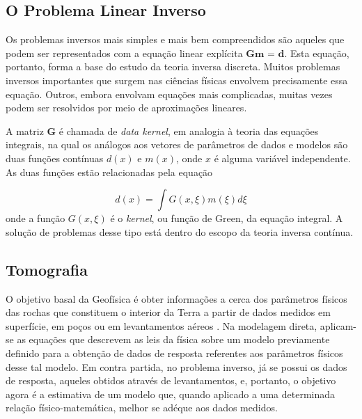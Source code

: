\documentclass[a4paper, 12 pt]{article} %
\begin{document}
\newpage

\subsection{O Problema Linear Inverso}

Os problemas inversos mais simples e mais bem compreendidos são aqueles que podem ser representados com a equação linear explícita $\textbf{Gm = d}$. Esta equação, portanto, forma a base do estudo da teoria inversa discreta. Muitos problemas inversos importantes que surgem nas ciências físicas envolvem precisamente essa equação. Outros, embora envolvam equações mais complicadas, muitas vezes podem ser resolvidos por meio de aproximações lineares.

A matriz $\textbf{G}$ é chamada de \textit{data kernel}, em analogia à teoria das equações integrais, na qual os análogos aos vetores de parâmetros de dados e modelos são duas funções contínuas $d(x)$ e $m(x)$, onde $x$ é alguma variável independente. As duas funções estão relacionadas pela equação

\begin{equation}\label{eq:inversão}
d(x) = \int G(x, \xi)m(\xi)d\xi
\end{equation}
onde a função $G(x, \xi)$ é o \textit{kernel}, ou função de Green, da equação integral. A solução de problemas desse tipo está dentro do escopo da teoria inversa contínua.


\subsection{Tomografia}

O objetivo basal da Geofísica é obter informações a cerca dos parâmetros físicos das rochas que constituem o interior da Terra a partir de dados medidos em superfície, em poços ou em levantamentos aéreos \citep{reis2015aplicaccao}. Na modelagem direta, aplicam-se as equações que descrevem as leis da física sobre um modelo previamente definido para a obtenção de dados de resposta referentes aos parâmetros físicos desse tal modelo. Em contra partida, no problema inverso, já se possui os dados de resposta, aqueles obtidos através de levantamentos, e, portanto, o objetivo agora é a estimativa de um modelo que, quando aplicado a uma determinada relação físico-matemática, melhor se adéque aos dados medidos.
\end{document}
